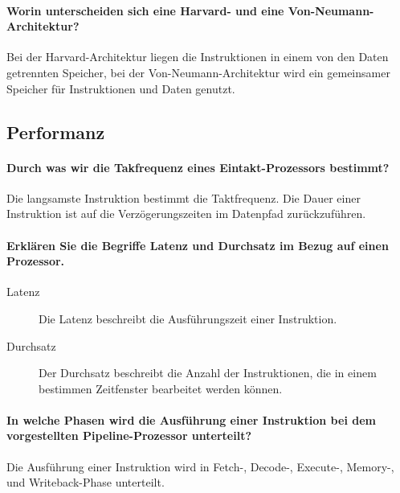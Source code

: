         \paragraph{Worin unterscheiden sich eine Harvard- und eine Von-Neumann-Architektur?}
            Bei der Harvard-Architektur liegen die Instruktionen in einem von den Daten getrennten Speicher, bei der Von-Neumann-Architektur wird ein gemeinsamer Speicher für Instruktionen und Daten genutzt.

        \subsection{Performanz}
            \paragraph{Durch was wir die Takfrequenz eines Eintakt-Prozessors bestimmt?}
                Die langsamste Instruktion bestimmt die Taktfrequenz. Die Dauer einer Instruktion ist auf die Verzögerungszeiten im Datenpfad zurückzuführen.

            \paragraph{Erklären Sie die Begriffe Latenz und Durchsatz im Bezug auf einen Prozessor.}
                \begin{description}
                    \item[Latenz] Die Latenz beschreibt die Ausführungszeit einer Instruktion.
                    \item[Durchsatz] Der Durchsatz beschreibt die Anzahl der Instruktionen, die in einem bestimmen Zeitfenster bearbeitet werden können.
                \end{description}

            \paragraph{In welche Phasen wird die Ausführung einer Instruktion bei dem vorgestellten Pipeline-Prozessor unterteilt?}
                Die Ausführung einer Instruktion wird in Fetch-, Decode-, Execute-, Memory-, und Writeback-Phase unterteilt.

